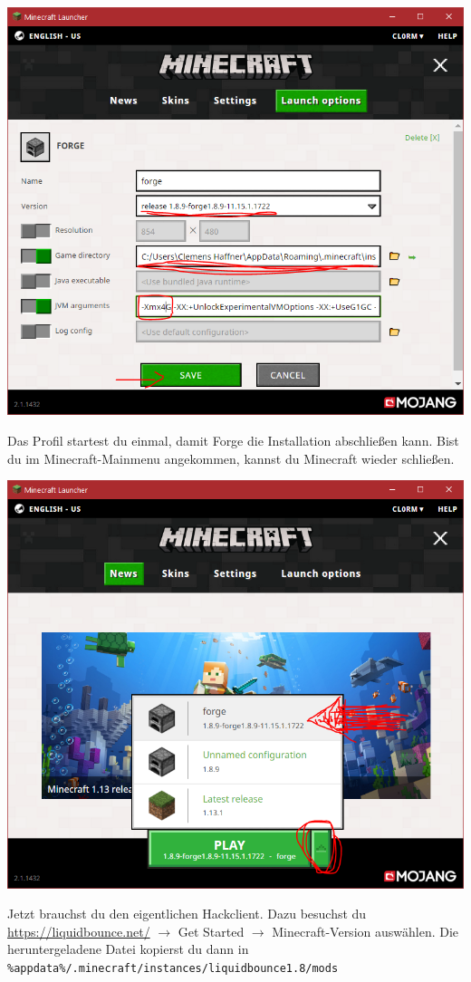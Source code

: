 \includegraphics[scale=0.4, center]{TeX_files/pics/installation_advanced_settings.png}

Das Profil startest du einmal, damit Forge die Installation abschließen kann. Bist du im Minecraft-Mainmenu angekommen, kannst du Minecraft wieder schließen.

\includegraphics[scale=0.4, center]{TeX_files/pics/installation_starten.png}

Jetzt brauchst du den eigentlichen Hackclient. Dazu besuchst du \url{https://liquidbounce.net/} $\to$ Get Started $\to$ Minecraft-Version auswählen. Die heruntergeladene Datei kopierst du dann in \\ \texttt{\%appdata\%/.minecraft/instances/liquidbounce1.8/mods}